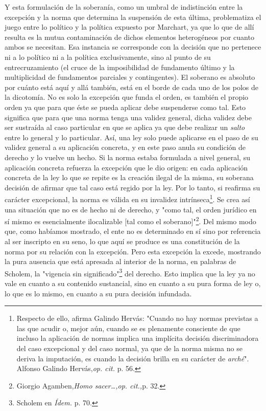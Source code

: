 \documentclass{book}
\begin{document}
Y esta formulación de la soberanía, como un umbral de indistinción entre
la excepción y la norma que determina la suspensión de esta última,
problematiza el juego entre lo político y la política expuesto por
Marchart, ya que lo que de allí resulta es la mutua contaminación de
dichos elementos heterogéneos por cuanto ambos se necesitan. Esa
instancia se corresponde con la decisión que no pertenece ni a lo
político ni a la política exclusivamente, sino al punto de su
entrecruzamiento (el cruce de la imposibilidad de fundamento último y la
multiplicidad de fundamentos parciales y contingentes). El soberano es
absoluto por cuánto está aquí y allá también, está en el borde de cada
uno de los polos de la dicotomía. No es solo la excepción que funda el
orden, es también el propio orden ya que para que éste se pueda aplicar
debe suspenderse como tal. Esto significa que para que una norma tenga
una validez general, dicha validez debe ser sustraída al caso particular
en que se aplica ya que debe realizar un \emph{salto} entre lo general y
lo particular. Así, una ley solo puede aplicarse en el paso de su
validez general a su aplicación concreta, y en este paso anula su
condición de derecho y lo vuelve un hecho. Si la norma estaba formulada
a nivel general, su aplicación concreta refuerza la excepción que le dio
origen: en cada aplicación concreta de la ley lo que se repite es la
creación ilegal de la misma, su soberana decisión de afirmar que tal
caso está regido por la ley. Por lo tanto, si reafirma su carácter
excepcional, la norma es válida en su invalidez intrínseca\footnote{Respecto
  de ello, afirma Galindo Hervás: "Cuando no hay normas previstas a las
  que acudir o, mejor aún, cuando se es plenamente consciente de que
  incluso la aplicación de normas implica una implícita decisión
  discriminadora del caso excepcional y del caso normal, ya que de la
  norma misma no se deriva la imputación, es cuando la decisión brilla
  en su carácter de \emph{arché}". Alfonso Galindo Hervás,\emph{op.
  cit.} p. 56.}. Se crea así una situación que no es de hecho ni de
derecho, y "como tal, el orden jurídico en sí mismo es esencialmente
ilocalizable {[}tal como el soberano{]}"\footnote{Giorgio
  Agamben,\emph{Homo sacer\ldots,op. cit.,}p. 32.}. Del mismo modo que,
como habíamos mostrado, el ente no es determinado en sí sino por
referencia al ser inscripto en su seno, lo que aquí se produce es una
constitución de la norma por su relación con la excepción. Pero esta
excepción la excede, mostrando la pura ausencia que está apresada al
interior de la norma, en palabras de Scholem, la "vigencia sin
significado"\footnote{Scholem en \emph{Ídem.} p. 70.} del derecho. Esto
implica que la ley ya no vale en cuanto a su contenido sustancial, sino
en cuanto a su pura forma de ley o, lo que es lo mismo, en cuanto a su
pura decisión infundada.
\end{document}
